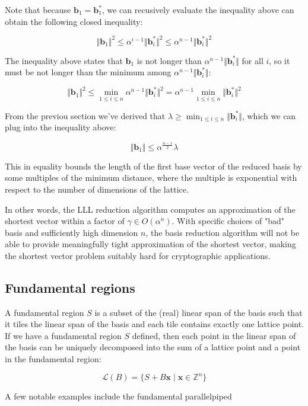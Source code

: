 \documentclass[letterpaper,12pt]{article}
\begin{document}
Note that because $\mathbf{b}_1 = \mathbf{b}_1^\ast$, we can recusively evaluate the inequality above can obtain the following closed inequality:

$$
\Vert \mathbf{b}_1 \Vert^2 \leq \alpha^{i-1} \Vert \mathbf{b}_{i}^\ast \Vert^2 \leq \alpha^{n-1} \Vert \mathbf{b}_{i}^\ast \Vert^2
$$

The inequality above states that $\mathbf{b}_1$ is not longer than $\alpha^{n-1} \Vert \mathbf{b}_{i}^\ast \Vert$ for all $i$, so it must be not longer than the minimum among $\alpha^{n-1} \Vert \mathbf{b}_{i}^\ast \Vert$:

$$
\Vert \mathbf{b}_1 \Vert^2 \leq \min_{1 \leq i \leq n}\alpha^{n-1} \Vert \mathbf{b}_{i}^\ast \Vert^2 = \alpha^{n-1} \min_{1 \leq i \leq n}\Vert \mathbf{b}_{i}^\ast \Vert^2
$$

From the previou section we've derived that $\lambda \geq \min_{1 \leq i \leq n} \Vert \mathbf{b}_i^\ast \Vert$, which we can plug into the inequality above:

$$
\Vert \mathbf{b}_1 \Vert \leq \alpha^\frac{n-1}{2} \lambda
$$

This in equality bounds the length of the first base vector of the reduced basis by some multiples of the minimum distance, where the multiple is exponential with respect to the number of dimensions of the lattice.

In other words, the LLL reduction algorithm computes an approximation of the shortest vector within a factor of $\gamma \in O(\alpha^n)$. With specific choices of "bad" basis and sufficiently high dimension $n$, the basis reduction algorithm will not be able to provide meaningfully tight approximation of the shortest vector, making the shortest vector problem suitably hard for cryptographic applications.


\subsection{Fundamental regions}
A fundamental region $S$ is a subset of the (real) linear span of the basis such that it tiles the linear span of the basis and each tile contains exactly one lattice point. If we have a fundamental region $S$ defined, then each point in the linear span of the basis can be uniquely decomposed into the sum of a lattice point and a point in the fundamental region:

$$
\mathcal{L}(B) = \{S + B\mathbf{x} \mid \mathbf{x} \in \mathbb{Z}^n\}
$$

A few notable examples include the fundamental parallelpiped 
\end{document}
